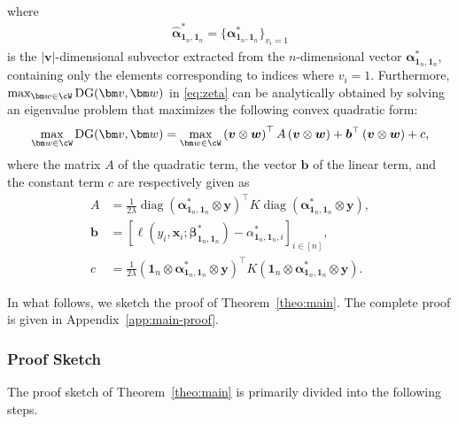 \begin{theorem}
\begin{align}
\end{align}
where  
\begin{align*}
  \hat{\bm \alpha}_{\bm 1_n, \bm 1_n}^{*} = \{\bm \alpha^*_{\bm 1_n, \bm 1_n}\}_{v_i = 1}  
\end{align*}
is the $|\bm v|$-dimensional subvector extracted from the $n$-dimensional vector $\bm \alpha^*_{\bm 1_n, \bm 1_n}$, containing only the elements corresponding to indices where $v_i = 1$.
%
Furthermore, $ \max_{\bm w \in \cW} {\rm DG}(\bm v, \bm w) $  
in \eqref{eq:zeta} can be analytically obtained by solving an eigenvalue problem that maximizes the following convex quadratic form:  
\begin{align}  
\label{eq:maximum-gap}  
\max_{\bm w \in \cW} {\rm DG}(\bm v, \bm w) =  
\max_{\bm w \in \cW}  
\left(\boldsymbol{v} \otimes \boldsymbol{w}\right)^{\top} A \left(\boldsymbol{v} \otimes \boldsymbol{w}\right) + \boldsymbol{b}^{\top}\left(\boldsymbol{v} \otimes \boldsymbol{w}\right) + c,  
\end{align}  
where the matrix $ A $ of the quadratic term, the vector $ \bm b $ of the linear term, and the constant term $ c $ are respectively given as  
\begin{align*}  
A  
&=  
\frac{1}{2\lambda} \operatorname{diag}(\bm\alpha_{\bm 1_n, \bm 1_n}^* \otimes \boldsymbol{y})^{\top} K \operatorname{diag}(\bm\alpha_{\bm 1_n, \bm 1_n}^* \otimes \boldsymbol{y}),  
\\  
\bm b  
&=  
\left[\ell(y_i, \bm x_i; \bm \beta_{\bm 1_n, \bm 1_n}^*) - {\alpha}_{\bm 1_n, \bm 1_n, i}^* \right]_{i \in [n]},  
\\  
c  
&=  
\frac{1}{2\lambda} (\bm 1_n \otimes \bm\alpha_{\bm 1_n, \bm 1_n}^* \otimes \boldsymbol{y})^{\top} K (\bm 1_n \otimes \bm\alpha_{\bm 1_n, \bm 1_n}^* \otimes \boldsymbol{y}).  
\end{align*}  

\end{theorem}
%
In what follows, we sketch the proof of Theorem~\ref{theo:main}. The complete proof is given in {Appendix~\ref{app:main-proof}}.


\subsubsection{Proof Sketch}

The proof sketch of Theorem~\ref{theo:main} is primarily divided into the following steps.

